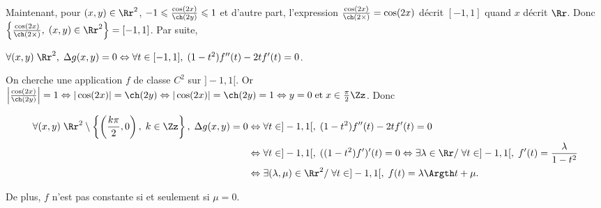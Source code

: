 {{Maintenant, pour $(x,y)\in\Rr^2$, $-1\leqslant  \frac{\cos(2x)}{\ch(2y)}\leqslant1$ et d'autre part, l'expression  $ \frac{\cos(2x)}{\ch(2\times)}=\cos(2x)$ décrit $[-1,1]$ quand $x$ décrit $\Rr$. Donc $\left\{ \frac{\cos(2x)}{\ch(2\times)},\;(x,y)\in\Rr^2\right\}=[-1,1]$. Par suite,

\begin{center}
$\forall(x,y)\;\Rr^2,\;\Delta g(x,y)=0\Leftrightarrow\forall t\in[-1,1],\;(1-t^2)f''(t)-2tf'(t)=0$.
\end{center}

On cherche une application $f$ de classe $C^2$ sur $]-1,1[$. Or $\left| \frac{\cos(2x)}{\ch(2y)}\right|=1\Leftrightarrow|\cos(2x)|=\ch(2y)\Leftrightarrow|\cos(2x)|=\ch(2y)=1\Leftrightarrow y=0\;\text{et}\;x\in \frac{\pi}{2}\Zz$. Donc

\begin{align*}\ensuremath
\forall(x,y)\;\Rr^2\setminus\left\{\left( \frac{k\pi}{2},0\right),\;k\in\Zz\right\},\;\Delta g(x,y)=0&\Leftrightarrow\forall t\in]-1,1[,\;(1-t^2)f''(t)-2tf'(t)=0\\
 &\Leftrightarrow\forall t\in]-1,1[,\;((1-t^2)f')'(t)=0\Leftrightarrow\exists\lambda\in\Rr/\;\forall t\in]-1,1[,\;f'(t)= \frac{\lambda}{1-t^2}\\
 &\Leftrightarrow\exists(\lambda,\mu)\in\Rr^2/\;\forall t\in]-1,1[,\;f(t)=\lambda\Argth t+\mu.
\end{align*}

De plus, $f$ n'est pas constante si et seulement si $\mu=0$.

\begin{center}
\end{center}
}
}
